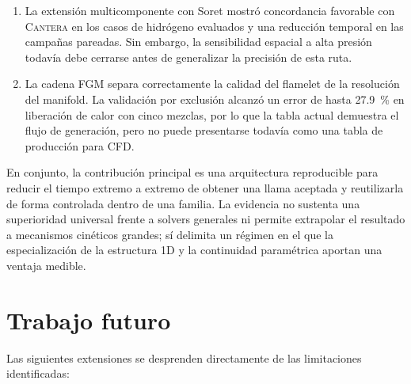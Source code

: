 \documentclass[12pt,a4paper,twoside,openany]{book}
\newcommand{\Cantera}{\textsc{Cantera}\xspace}
\begin{document}
\begin{enumerate}
  \item La extensión multicomponente con Soret mostró concordancia favorable
        con \Cantera en los casos de hidrógeno evaluados y una reducción
        temporal en las campañas pareadas. Sin embargo, la sensibilidad espacial
        a alta presión todavía debe cerrarse antes de generalizar la precisión
        de esta ruta.

  \item La cadena FGM separa correctamente la calidad del flamelet de la
        resolución del manifold. La validación por exclusión alcanzó un error de
        hasta \SI{27.9}{\percent} en liberación de calor con cinco mezclas, por
        lo que la tabla actual demuestra el flujo de generación, pero no puede
        presentarse todavía como una tabla de producción para CFD.
\end{enumerate}

En conjunto, la contribución principal es una arquitectura reproducible para
reducir el tiempo extremo a extremo de obtener una llama aceptada y reutilizarla
de forma controlada dentro de una familia. La evidencia no sustenta una
superioridad universal frente a solvers generales ni permite extrapolar el
resultado a mecanismos cinéticos grandes; sí delimita un régimen en el que la
especialización de la estructura 1D y la continuidad paramétrica aportan una
ventaja medible.

\section{Trabajo futuro}

Las siguientes extensiones se desprenden directamente de las limitaciones
identificadas:
\end{document}
